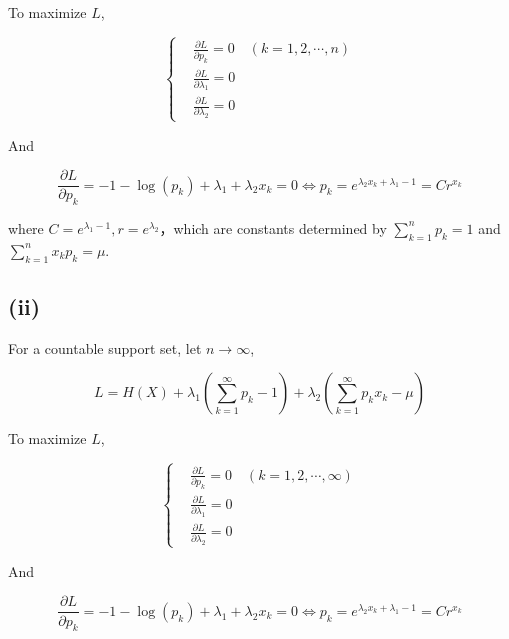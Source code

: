 \documentclass{article}
\begin{document}
To maximize $L$,

\begin{equation}
    \left\{
    \begin{aligned}
         &\frac{\partial L}{ \partial p_k} = 0\quad (k=1,2,\cdots,n)\\
        &\frac{\partial L}{ \partial \lambda_1} = 0 \\
        &\frac{\partial L}{ \partial \lambda_2}  = 0 
    \end{aligned}
    \right.
\end{equation}

And 

\begin{equation}
    \frac{\partial L}{ \partial p_k} = -1-\log(p_k) + \lambda_1 +\lambda_2 x_k = 0 \Longleftrightarrow p_k = e^{\lambda_2 x_k +\lambda_1-1} = Cr^{x_k}
\end{equation}

where $C = e^{\lambda_1 -1},r = e^{\lambda_2}$，which are constants determined by $\sum_{k=1}^n p_k =1$ and $\sum_{k=1}^n x_kp_k =\mu$.

\subsection{(ii)}

For a countable support set, let $n\to \infty$,

\begin{equation}
    L = H(X) + \lambda_1(\sum_{k=1}^{\infty} p_k - 1) + \lambda_2 (\sum_{k=1}^{\infty} p_kx_k - \mu)
\end{equation}

To maximize $L$,

\begin{equation}
    \left\{
    \begin{aligned}
         &\frac{\partial L}{ \partial p_k} = 0\quad (k=1,2,\cdots,\infty)\\
        &\frac{\partial L}{ \partial \lambda_1} = 0 \\
        &\frac{\partial L}{ \partial \lambda_2}  = 0 
    \end{aligned}
    \right.
\end{equation}

And 

\begin{equation}
    \frac{\partial L}{ \partial p_k} = -1-\log(p_k) + \lambda_1 +\lambda_2 x_k = 0 \Longleftrightarrow p_k = e^{\lambda_2 x_k +\lambda_1-1} = Cr^{x_k}
\end{equation}
\end{document}
